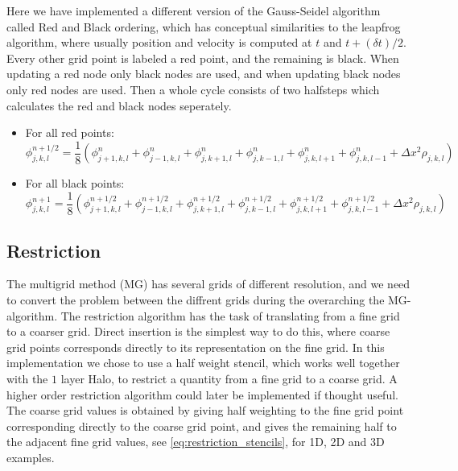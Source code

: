     	Here we have implemented a different version of the Gauss-Seidel algorithm called Red and Black ordering, which has conceptual similarities
    	to the leapfrog algorithm, where usually position and velocity is computed at \(t\) and \( t+(\delta t)/2 \). Every other grid point is labeled a
    	red point, and the remaining is black. When updating a red node only black nodes are used, and when updating black nodes only
    	red nodes are used. Then a whole cycle consists of two halfsteps which calculates the red and black nodes seperately.

    	\begin{itemize}
    		\item For all red points:
    			\[\phi^{n+1/2}_{j,k,l} = \frac{1}{8} \left( \phi^n_{j+1,k,l} +\phi^{n}_{j-1,k,l} + \phi^n_{j,k+1,l} + \phi^{n}_{j,k-1,l} +
    	 							\phi^n_{j,k,l+1} + \phi^{n}_{j,k,l-1} + \Delta x^2 \rho_{j,k,l} \right)
    			\]
    		\item For all black points:
    		\[\phi^{n+1}_{j,k,l} = \frac{1}{8} \left( \phi^{n+1/2}_{j+1,k,l} +\phi^{n+1/2}_{j-1,k,l} + \phi^{n+1/2}_{j,k+1,l} + \phi^{n+1/2}_{j,k-1,l} +
    							\phi^{n+1/2}_{j,k,l+1} + \phi^{n+1/2}_{j,k,l-1} + \Delta x^2 \rho_{j,k,l} \right)
    		\]
    	\end{itemize}

        \subsection{Restriction}
        	\label{sec:restr_simple}
        	The multigrid method (MG) has several grids of different resolution, and we need to
         	convert the problem between the diffrent grids during the overarching the MG-algorithm.
         	The restriction algorithm has the task of translating from a fine grid to a coarser grid.
			Direct insertion is the simplest way to do this, where coarse grid points
			corresponds directly to its representation on the fine grid.
        	In this implementation we chose to use a half weight stencil, which works well together
			with the \(1\) layer Halo, to restrict a quantity from a fine
        	grid to a coarse grid. A higher order restriction algorithm could later
			be implemented if thought useful. The coarse grid values is obtained by giving half weighting to
        	the fine grid point corresponding directly to the coarse grid point, and gives the remaining
        	half to the adjacent fine grid values, see \eqref{eq:restriction_stencils}, for 1D,
        	2D and 3D examples.

